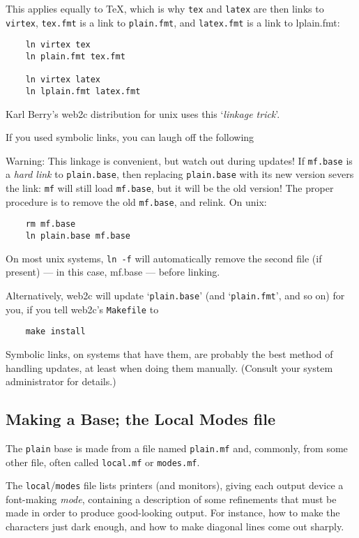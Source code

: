 This applies equally to \TeX{}, which is why {\tt tex} and {\tt latex}
are then links to {\tt virtex}, {\tt tex.fmt} is a link to
{\tt plain.fmt}, and {\tt latex.fmt} is a link to {lplain.fmt}:
\begin{verbatim}
    ln virtex tex
    ln plain.fmt tex.fmt

    ln virtex latex
    ln lplain.fmt latex.fmt
\end{verbatim}

Karl {\sc Berry\/}'s {\sf web2c} distribution for {\sc unix} uses
this `{\em linkage trick\/}'.

If you used symbolic links, you can laugh off the following

{\sc Warning:}
This linkage is convenient, but watch out during updates!
If {\tt mf.base} is a {\em hard link\/}
to {\tt plain.base}, then replacing {\tt plain.base} with its
new version severs the link:  {\tt mf} will still load {\tt mf.base},
but it will be the old version!  The proper procedure is to remove
the old {\tt mf.base}, and relink.  On {\sc unix}:
\begin{verbatim}
    rm mf.base
    ln plain.base mf.base
\end{verbatim}
On most {\sc unix\/} systems, {\tt ln -f} will automatically remove
the second file (if present) --- in this case, mf.base --- before linking.

Alternatively, {\sf web2c} will update `{\tt plain.base}'
(and `{\tt plain.fmt}', and so on) for you,
if you tell {\sf web2c\/}'s {\tt Makefile}  to
\begin{verbatim}
    make install
\end{verbatim}
Symbolic links, on systems that have them, are probably the best
method of handling updates, at least when doing them manually.
(Consult your system administrator for details.)


\subsection{Making a Base; the Local Modes file}\label{sub:modes}

The {\tt plain} base is made from a \MF{} file named
{\tt plain.mf} and, commonly, from some other file, often called
{\tt local.mf} or {\tt modes.mf}.

The {\tt local}/{\tt modes} file lists printers (and monitors), giving
each output device a font-making {\em mode\/}, containing a
description of some refinements that must be made in order to produce
good-looking output.  For instance, how to make the characters just
dark enough, and how to make diagonal lines come out sharply.

